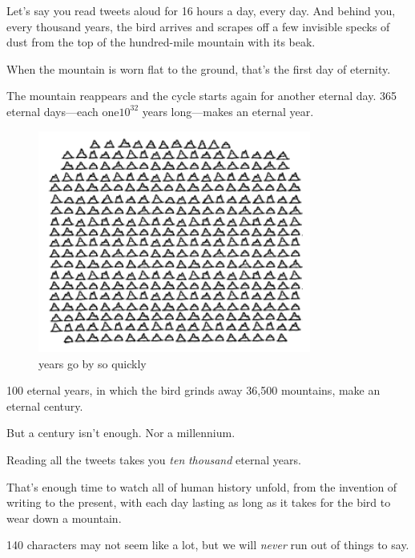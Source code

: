 {Let’s say you read tweets aloud for 16 hours a day, every day. And behind you, every thousand years, the bird arrives and scrapes off a few invisible specks of dust from the top of the hundred-mile mountain with its beak.}

{When the mountain is worn flat to the ground, that’s the first day of eternity.}

{The mountain reappears and the cycle starts again for another eternal day. 365 eternal days—each one\( 10^{32}\) years long—makes an eternal year.}

\begin{figure}[!htbp]
\centering
\includegraphics[scale=0.5, max width=0.8\textwidth]{imgs/a/34/twitter_mountains.png}
\caption{years go by so quickly}
\end{figure}

{100 eternal years, in which the bird grinds away 36,500 mountains, make an eternal century.}

{But a century isn’t enough. Nor a millennium.}

{Reading all the tweets takes you \emph{ten} \emph{thousand} eternal years.}

{That’s enough time to watch all of human history unfold, from the invention of writing to the present, with each day lasting as long as it takes for the bird to wear down a mountain.}

{140 characters may not seem like a lot, but we will \emph{never} run out of things to say.}

